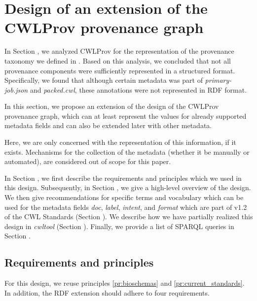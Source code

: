 \twocolumn
\section{Design of an extension of the CWLProv provenance graph}
\label{sec:dev_recommendatons}





In Section \emph{}, we analyzed CWLProv for the representation of the provenance taxonomy we defined in \emph{}. Based on this analysis, we concluded that not all provenance components were sufficiently represented in a structured format. Specifically, we found that although certain metadata was part of \emph{primary-job.json} and \emph{packed.cwl}, these annotations were not represented in RDF format.

In this section, we propose an extension of the design of the CWLProv provenance graph, which can at least represent the values for already supported metadata fields and can also be extended later with other metadata. %

Here, we are only concerned with the representation of this information, if it exists. Mechanisms for the collection of the metadata (whether it be manually or automated), are considered out of scope for this paper. 

In Section \emph{}, we first describe the requirements and principles which we used in this design. Subsequently, in Section \emph{}, we give a high-level overview of the design. We then give recommendations for specific terms and vocabulary which can be used for the metadata fields \emph{doc}, \emph{label}, \emph{intent}, and \emph{format} which are part of v1.2 of the CWL Standards (Section \emph{}). We describe how we have partially realized this design in \emph{cwltool} (Section \emph{}). Finally, we provide a list of SPARQL queries in Section \emph{}.

\subsection{Requirements and principles}
\label{sec:ext_reqs}
For this design, we reuse principles \ref{pr:bioschemas} and \ref{pr:current_standards}. In addition, the RDF extension should adhere to four requirements.

